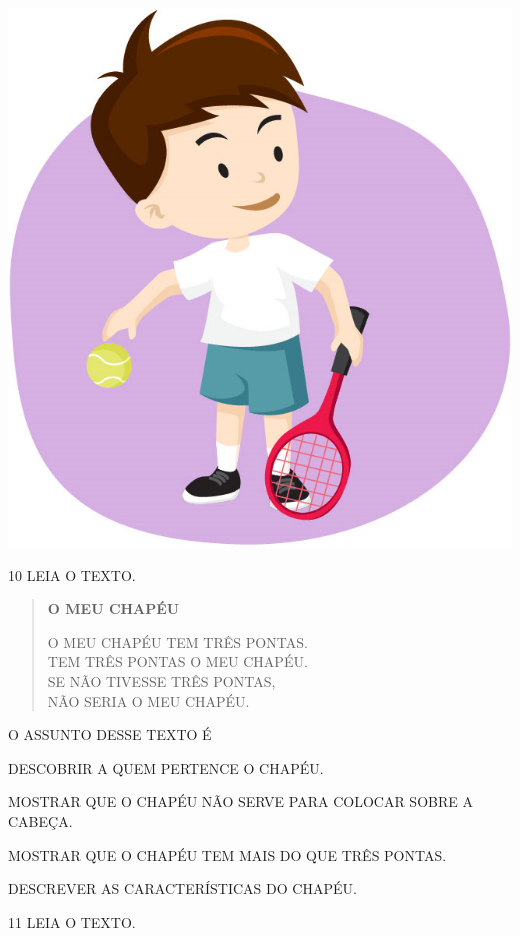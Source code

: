 \begin{multicols}{2}
\begin{escolha}
\item \includegraphics[width=.5\textwidth]{media/image258d.png}
\end{escolha}
\end{multicols}

\pagebreak

\num{10} LEIA O TEXTO.

\begin{myquote}
\begin{verse}
\textbf{O MEU CHAPÉU}

O MEU CHAPÉU TEM TRÊS PONTAS.\\
TEM TRÊS PONTAS O MEU CHAPÉU.\\
SE NÃO TIVESSE TRÊS PONTAS,\\
NÃO SERIA O MEU CHAPÉU.
\end{verse}

\end{myquote}

O ASSUNTO DESSE TEXTO É

\begin{escolha}[itemsep=-5pt]
\item DESCOBRIR A QUEM PERTENCE O CHAPÉU.

\item MOSTRAR QUE O CHAPÉU NÃO SERVE PARA COLOCAR SOBRE A CABEÇA.

\item MOSTRAR QUE O CHAPÉU TEM MAIS DO QUE TRÊS PONTAS.

\item DESCREVER AS CARACTERÍSTICAS DO CHAPÉU.
\end{escolha}


\num{11} LEIA O TEXTO.

